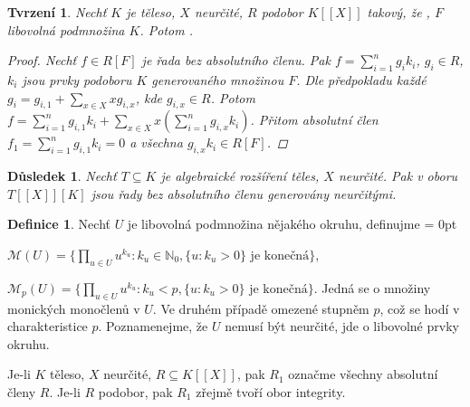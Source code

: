 \documentclass[11pt,a4paper]{article}
\newcommand\m[1]{\mathbb { #1 }} %
\newcommand\p[1]{\mathcal{ #1 }} %
\newcommand\N{\m N}
\newenvironment{items}{%
	\itemize
	\itemsep = 0pt%
}{%
	\enditemize
}
\newcounter{numb}
\theoremstyle{definition}
\newtheorem*{definice}{Definice}
\theoremstyle{plain}
\newtheorem{tvrzeni}[numb]{Tvrzení}
\newtheorem{dusledek}[numb]{Důsledek}
\begin{document}
\begin{tvrzeni} \label{thm:RF_absOK}
	Nechť $K$ je těleso, $X$ neurčité, $R$ podobor $K[[X]]$ takový, že , $F$ libovolná podmnožina $K$. Potom .
	
	\begin{proof}
		\newcommand{\I}{_{i = 1}^n}
		
		Nechť $f \in R[F]$ je řada bez absolutního členu. Pak $f = \sum\I g_i k_i$, $g_i \in R$, $k_i$ jsou prvky podoboru $K$ generovaného množinou $F$. Dle předpokladu každé $g_i = g_{i, 1} + \sum_{x \in X} x g_{i, x}$, kde $g_{i, x} \in R$. Potom $f = \sum\I g_{i, 1} k_i + \sum_{x \in X} x (\sum\I g_{i, x} k_i)$. Přitom absolutní člen $f_1 = \sum\I g_{i, 1} k_i = 0$ a všechna $g_{i, x} k_i \in R[F]$.
	\end{proof}
\end{tvrzeni}

\begin{dusledek} \label{thm:TXK_absOK}
	Nechť $T \subseteq K$ je algebraické rozšíření těles, $X$ neurčité. Pak v oboru $T[[X]][K]$ jsou řady bez absolutního členu generovány neurčitými.
\end{dusledek}

\begin{definice}
	Nechť $U$ je libovolná podmnožina nějakého okruhu, definujme
	\begin{items}
		\item $\p M(U) = \{\prod_{u \in U} u^{k_u}: k_u \in \N_0, \{u: k_u > 0\} \text{ je konečná}\}$,
		\item $\p M_p(U) = \{\prod_{u \in U} u^{k_u}: k_u < p, \{u: k_u > 0\} \text{ je konečná}\}$.
	\end{items}
	Jedná se o množiny monických monočlenů v $U$. Ve druhém případě omezené stupněm $p$, což se hodí v charakteristice $p$. Poznamenejme, že $U$ nemusí být neurčité, jde o libovolné prvky okruhu.
	
	Je-li $K$ těleso, $X$ neurčité, $R \subseteq K[[X]]$, pak $R_1$ označme všechny absolutní členy $R$. Je-li $R$ podobor, pak $R_1$ zřejmě tvoří obor integrity.
\end{definice}
\end{document}
